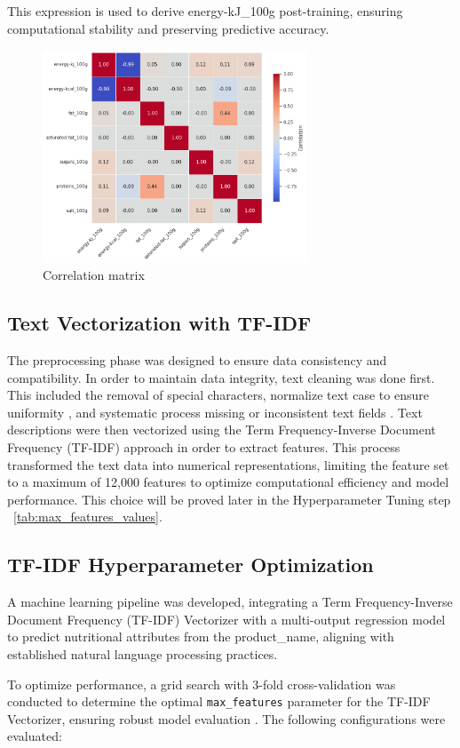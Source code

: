 This expression is used to derive energy-kJ\_100g post-training, ensuring computational stability and preserving predictive accuracy.

\begin{figure}[H]
\includegraphics[width=0.7\textwidth]{images/correlation_matrix.png}
\caption{Correlation matrix} 
\label{fig:Correlation_matrix}
\end{figure}

\subsection{Text Vectorization with TF-IDF}
The preprocessing phase was designed to ensure data consistency and compatibility. In order to maintain data integrity, text cleaning was done first. This included the removal of special characters, normalize text case to ensure uniformity , and systematic process missing or inconsistent text fields . Text descriptions were then vectorized using the Term Frequency-Inverse Document Frequency (TF-IDF) approach in order to extract features. This process transformed the text data into numerical representations, limiting the feature set to a maximum of 12,000 features  to optimize computational efficiency and model performance. This choice will be proved later in the Hyperparameter Tuning step ~\ref{tab:max_features_values}.

\subsection{TF-IDF Hyperparameter Optimization}
A machine learning pipeline was developed, integrating a Term Frequency-Inverse Document Frequency (TF-IDF) Vectorizer with a multi-output regression model to predict nutritional attributes from the product\_name, aligning with established natural language processing practices.
\par To optimize performance, a grid search with 3-fold cross-validation was conducted to determine the optimal \texttt{max\_features} parameter for the TF-IDF Vectorizer, ensuring robust model evaluation \cite{hastie2009elements}. The following configurations were evaluated:

